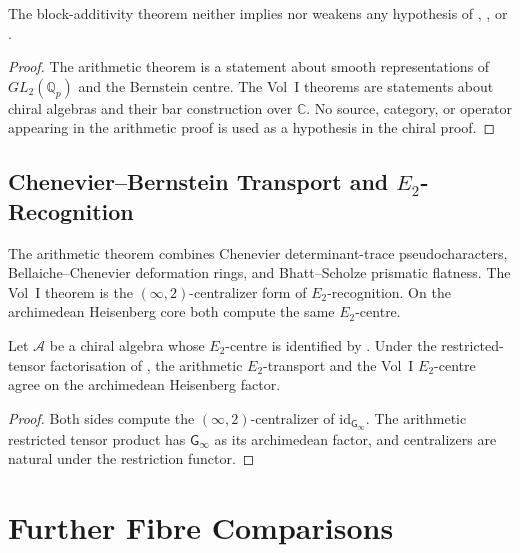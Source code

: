 \begin{theorem}
\label{v4-arith:w6-i:thm:W5-F-orthogonal}
The block-additivity theorem
 neither implies nor
weakens any hypothesis of
,
, or
.
\end{theorem}

\begin{proof}
The arithmetic theorem is a statement about smooth representations of
\(GL_2(\mathbb Q_p)\) and the Bernstein centre.  The Vol~I theorems
are statements about chiral algebras and their bar construction over
\(\mathbb C\).  No source, category, or operator appearing in the
arithmetic proof is used as a hypothesis in the chiral proof.
\end{proof}

\subsection{Chenevier--Bernstein Transport and \(E_2\)-Recognition}
\label{v4-arith:w6-i:W5-H-alignment}

The arithmetic theorem combines Chenevier determinant-trace
pseudocharacters, Bellaiche--Chenevier deformation rings, and
Bhatt--Scholze prismatic flatness.  The Vol~I theorem is the
\((\infty,2)\)-centralizer form of \(E_2\)-recognition.  On the
archimedean Heisenberg core both compute the same \(E_2\)-centre.

\begin{theorem}
\label{v4-arith:w6-i:thm:W5-H-alignment}
Let \(\mathcal A\) be a chiral algebra whose \(E_2\)-centre is
identified by .  Under the
restricted-tensor factorisation of
, the arithmetic \(E_2\)-transport
and the Vol~I \(E_2\)-centre agree on the archimedean Heisenberg
factor.
\end{theorem}

\begin{proof}
Both sides compute the \((\infty,2)\)-centralizer of
\(\mathrm{id}_{\mathsf G_\infty}\).  The arithmetic restricted tensor
product has \(\mathsf G_\infty\) as its archimedean factor, and
centralizers are natural under the restriction functor.
\end{proof}

\section{Further Fibre Comparisons}
\label{v4-arith:w6-i:restrictions}

